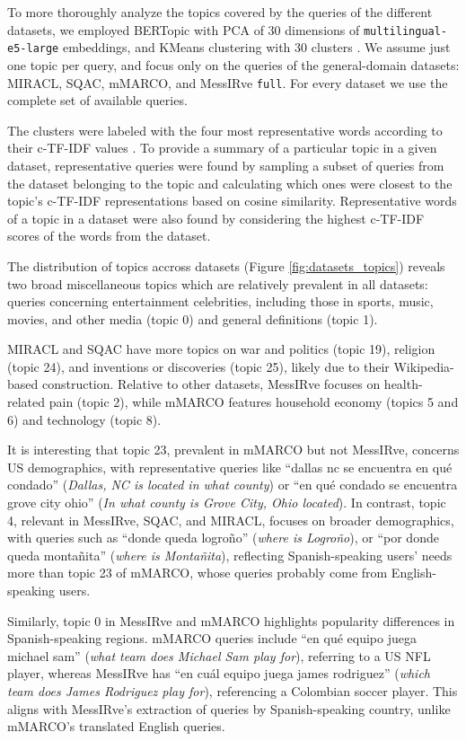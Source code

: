 \documentclass[11pt]{article}
\begin{document}
To more thoroughly analyze the topics covered by the queries of the different datasets, we employed BERTopic with PCA of 30 dimensions of \texttt{multilingual-e5-large} embeddings, and KMeans clustering with 30 clusters \citep{grootendorst2022bertopic,wang2024multilingual}. We assume just one topic per query, and focus only on the queries of the general-domain datasets: MIRACL, SQAC, mMARCO, and MessIRve \texttt{full}. For every dataset we use the complete set of available queries.

The clusters were labeled with the four most representative words according to their c-TF-IDF values \citep{grootendorst2022bertopic}. To provide a summary of a particular topic in a given dataset, representative queries were found by sampling a subset of queries from the dataset belonging to the topic and calculating which ones were closest to the topic's c-TF-IDF representations based on cosine similarity. Representative words of a topic in a dataset were also found by considering the highest c-TF-IDF scores of the words from the dataset.

The distribution of topics accross datasets (Figure \ref{fig:datasets_topics}) reveals two broad miscellaneous topics which are relatively prevalent in all datasets: queries concerning entertainment celebrities, including those in sports, music, movies, and other media (topic 0) and general definitions (topic 1).

MIRACL and SQAC have more topics on war and politics (topic 19), religion (topic 24), and inventions or discoveries (topic 25), likely due to their Wikipedia-based construction. Relative to other datasets, MessIRve focuses on health-related pain (topic 2), while mMARCO features household economy (topics 5 and 6) and technology (topic 8).


It is interesting that topic 23, prevalent in mMARCO but not MessIRve, concerns US demographics, with representative queries like ``dallas nc se encuentra en qué condado'' (\emph{Dallas, NC is located in what county}) or ``en qué condado se encuentra grove city ohio'' (\emph{In what county is Grove City, Ohio located}). In contrast, topic 4, relevant in MessIRve, SQAC, and MIRACL, focuses on broader demographics, with queries such as ``donde queda logroño'' (\emph{where is Logroño}), or ``por donde queda montañita'' (\emph{where is Montañita}), reflecting Spanish-speaking users' needs more than topic 23 of mMARCO, whose queries probably come from English-speaking users.


Similarly, topic 0 in MessIRve and mMARCO highlights popularity differences in Spanish-speaking regions. mMARCO queries include ``en qué equipo juega michael sam'' (\emph{what team does Michael Sam play for}), referring to a US NFL player, whereas MessIRve has ``en cuál equipo juega james rodriguez'' (\emph{which team does James Rodriguez play for}), referencing a Colombian soccer player. This aligns with MessIRve's extraction of queries by Spanish-speaking country, unlike mMARCO's translated English queries.
\end{document}
